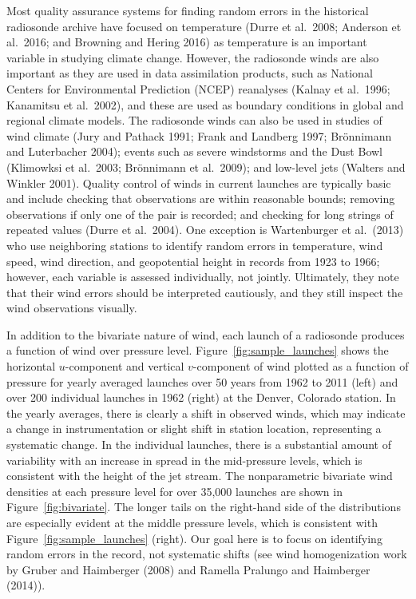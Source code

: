 \documentclass[12pt]{article}
\begin{document}
\begin{doublespacing}
 Most quality assurance systems for finding random errors in the historical radiosonde archive  have  focused on temperature (Durre et al.~2008; Anderson et al.~2016; and Browning and Hering 2016) as temperature is an important variable in studying climate change.  However, the radiosonde winds are also important as they are used in data assimilation products, such as National Centers for Environmental Prediction (NCEP) reanalyses (Kalnay et al.~1996; Kanamitsu et al.~2002), and these are used as boundary conditions in global and regional climate models.  The radiosonde winds can also be used in studies of wind climate (Jury and Pathack 1991; Frank and Landberg 1997; Br\"{o}nnimann and Luterbacher 2004); events such as severe windstorms and the Dust Bowl (Klimowksi et al.~2003; Br\"{o}nnimann et al.~2009);  and low-level jets (Walters and Winkler 2001).  Quality control of winds in current launches are typically basic and include checking that observations are within reasonable bounds; removing observations if only one of the pair is recorded; and checking for long strings of repeated values (Durre et al.~2004).  One exception is Wartenburger et al.~(2013) who use neighboring stations to identify random errors in temperature, wind speed, wind direction, and geopotential height in records from 1923 to 1966; however, each variable is assessed individually, not jointly.  Ultimately,  they note that their wind errors should be interpreted cautiously, and  they still inspect the wind observations visually. 


In addition to the bivariate nature of wind, each launch of a radiosonde produces a function of wind over pressure level.  Figure~\ref{fig:sample_launches} shows the  horizontal $u$-component and vertical $v$-component of wind plotted as a function of pressure for yearly averaged launches over 50 years from 1962 to 2011 (left) and over 200 individual launches in 1962 (right) at the Denver, Colorado station.  In the yearly averages, there is clearly a shift  in observed winds, which may indicate a change in instrumentation or slight shift in station location, representing a systematic change.  In the individual launches, there is a substantial amount of variability with an increase in spread in the mid-pressure levels, which is consistent with the height of the jet stream.   The nonparametric bivariate wind densities at each pressure level for over 35,000 launches are shown in Figure~\ref{fig:bivariate}. The longer tails on the right-hand side of the distributions are especially evident at the middle pressure levels, which is consistent with Figure~\ref{fig:sample_launches} (right).   Our goal here is to focus on identifying random errors in the record, not systematic shifts (see wind homogenization work by Gruber and Haimberger (2008) and Ramella Pralungo and Haimberger (2014)).



\end{doublespacing}
\end{document}
